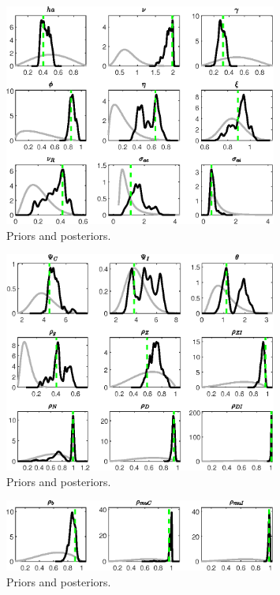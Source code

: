 \begin{figure}[H]
\centering
\includegraphics[width=0.80\textwidth]{BRS_sectoral/Output/BRS_sectoral_PriorsAndPosteriors3}
\caption{Priors and posteriors.}\label{Fig:PriorsAndPosteriors:3}
\end{figure}
 
\begin{figure}[H]
\centering
\includegraphics[width=0.80\textwidth]{BRS_sectoral/Output/BRS_sectoral_PriorsAndPosteriors4}
\caption{Priors and posteriors.}\label{Fig:PriorsAndPosteriors:4}
\end{figure}
 
\begin{figure}[H]
\centering
\includegraphics[width=0.80\textwidth]{BRS_sectoral/Output/BRS_sectoral_PriorsAndPosteriors5}
\caption{Priors and posteriors.}\label{Fig:PriorsAndPosteriors:5}
\end{figure}
 
